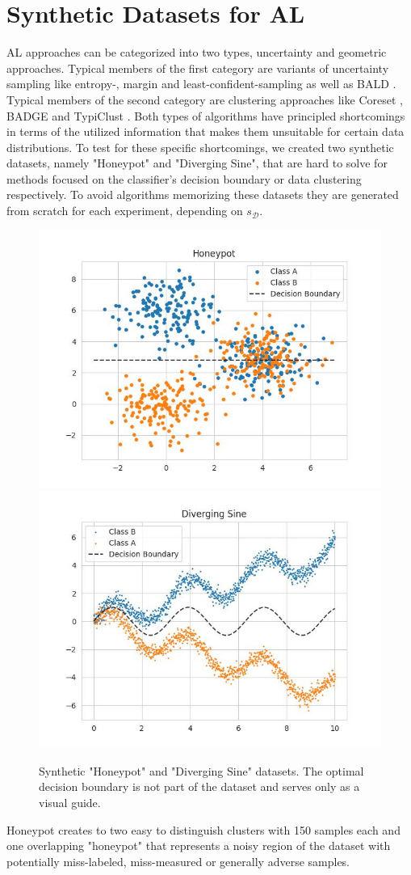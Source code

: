 \documentclass[]{article}
\newcommand{\D}{\mathcal{D}}
\begin{document}
\section{Synthetic Datasets for AL}
AL approaches can be categorized into two types, uncertainty and geometric approaches.
Typical members of the first category are variants of uncertainty sampling like entropy-, margin and least-confident-sampling \cite{wang2014new} as well as BALD \cite{gal2017deep}.
Typical members of the second category are clustering approaches like Coreset \cite{sener2017active}, BADGE \cite{ashdeep} and TypiClust \cite{hacohen2022active}.
Both types of algorithms have principled shortcomings in terms of the utilized information that makes them unsuitable for certain data distributions. 
To test for these specific shortcomings, we created two synthetic datasets, namely "Honeypot" and "Diverging Sine", that are hard to solve for methods focused on the classifier's decision boundary or data clustering respectively. 
To avoid algorithms memorizing these datasets they are generated from scratch for each experiment, depending on $s_\D$. \\
\begin{figure}[]
	\centering
	\includegraphics[width=0.4\linewidth]{img/honeypot.jpg}
	\includegraphics[width=0.4\linewidth]{img/diverging_sin.jpg}
	\caption{Synthetic "Honeypot" and "Diverging Sine" datasets. The optimal decision boundary is not part of the dataset and serves only as a visual guide.}
	\label{fig:synthDataAppendix}
\end{figure}
%
Honeypot creates to two easy to distinguish clusters with 150 samples each and one overlapping "honeypot" that represents a noisy region of the dataset with potentially miss-labeled, miss-measured or generally adverse samples.
\end{document}
